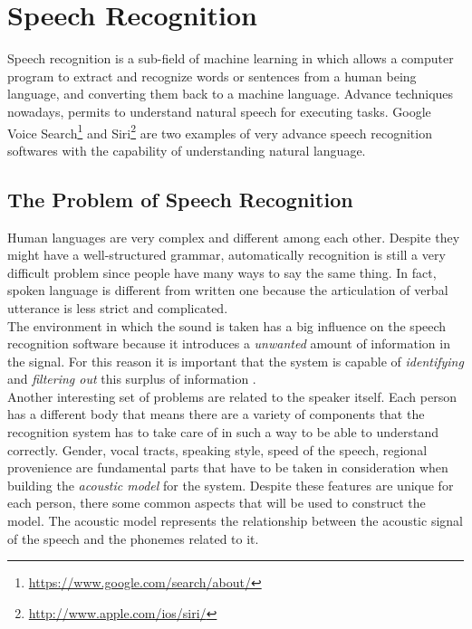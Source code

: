 \chapter{Speech Recognition}
\label{chap:Speech Recognition}
Speech recognition is a sub-field of machine learning in which allows a computer program to extract and recognize words or sentences from a human being language, and converting them back to a machine language. Advance techniques nowadays, permits to understand natural speech for executing tasks. Google Voice Search\footnote{\url{https://www.google.com/search/about/}} and Siri\footnote{\url{http://www.apple.com/ios/siri/}} are two examples of very advance speech recognition softwares with the capability of understanding natural language.

\section{The Problem of Speech Recognition}
\label{sec:The Problem of Speech Recognition}
Human languages are very complex and different among each other. Despite they might have a well-structured grammar, automatically recognition is still a very difficult problem since people have many ways to say the same thing. In fact, spoken language is different from written one because the articulation of verbal utterance is less strict and complicated. \\
The environment in which the sound is taken has a big influence on the speech recognition software because it introduces a \textit{unwanted} amount of information in the signal. For this reason it is important that the system is capable of \textit{identifying} and \textit{filtering out} this surplus of information \cite{forsberg2003speech}. \\

\noindent Another interesting set of problems are related to the speaker itself. Each person has a different body that means there are a variety of components that the recognition system has to take care of in such a way to be able to understand correctly. Gender, vocal tracts, speaking style, speed of the speech, regional provenience are fundamental parts that have to be taken in consideration when building the \textit{acoustic model} for the system. Despite these features are unique for each person, there some common aspects that will be used to construct the model. The acoustic model represents the relationship between the acoustic signal of the speech and the phonemes related to it. \\

